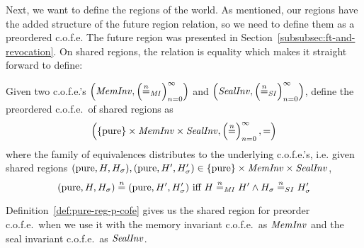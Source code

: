 \begin{jversion}
Next, we want to define the regions of the world.
As mentioned, our regions have the added structure of the future region relation, so we need to define them as a preordered c.o.f.e.
The future region was presented in Section~\ref{subsubsec:ft-and-revocation}.
On shared regions, the relation is equality which makes it straight forward to define:
\begin{definition}
  \label{def:pure-reg-p-cofe}
  Given two c.o.f.e.'s $\left(\var{MemInv},\left(\nequal[n]_\var{MI}\right)_{n=0}^{\infty}\right)$ and $\left(\var{SealInv},\left(\nequal[n]_{\var{SI}}\right)_{n=0}^{\infty}\right)$, define the preordered c.o.f.e.\ of shared regions as
  \[
  \left(\{\pure\}\times \var{MemInv} \times \var{SealInv},\left(\nequal[n]\right)_{n=0}^{\infty},=\right)
  \]
  where the family of equivalences distributes to the underlying c.o.f.e.'s, i.e. given shared regions $(\pure,H,H_\sigma), (\pure,H',H_\sigma') \in \{\pure\}\times \var{MemInv} \times \var{SealInv}$,
  \[
  (\pure,H,H_\sigma) \nequal (\pure,H',H_\sigma') \text{ iff } H \nequal_\var{MI} H' \wedge H_\sigma \nequal_{SI} H_\sigma'
  \]
\end{definition}
Definition~\ref{def:pure-reg-p-cofe} gives us the shared region for preorder c.o.f.e.\ when we use it with the memory invariant c.o.f.e.\ as $\var{MemInv}$ and the seal invariant c.o.f.e.\ as $\var{SealInv}$.


\end{jversion}
